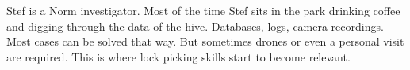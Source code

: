 \begin{npcBox}[title=Stef - a Norm investigator]
    \begin{stressSection}
    \end{stressSection}
    \begin{tabularx}{\textwidth}{ XX }
    \end{tabularx}

    \begin{consequences}
    \item {}
    \item {}
    \item {}
    \end{consequences}

    \begin{npcDescription}
    Stef is a Norm investigator. Most of the time Stef sits in the park drinking coffee and digging through the data of the hive. Databases, logs, camera recordings. Most cases can be solved that way. But sometimes drones or even a personal visit are required. This is where lock picking skills start to become relevant.
    \end{npcDescription}

\end{npcBox}

\newpage

